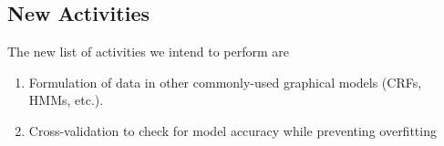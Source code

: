 \documentclass{article}
\begin{document}
\subsection{New Activities}
The new list of activities we intend to perform are
\begin{enumerate}
\item Formulation of data in other commonly-used graphical models (CRFs, HMMs, etc.).
\item Cross-validation to check for model accuracy while preventing overfitting
\end{enumerate}

\nocite{nasseri2008}


%
\end{document}

